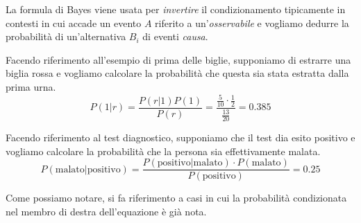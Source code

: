 La formula di Bayes viene usata per \emph{invertire} il condizionamento tipicamente in contesti
in cui accade un evento $A$ riferito a un'\emph{osservabile} e vogliamo dedurre la probabilità di
un'alternativa $B_i$ di eventi \emph{causa}.

\begin{example}
	Facendo riferimento all'esempio di prima delle biglie, supponiamo di estrarre una biglia
	rossa e vogliamo calcolare la probabilità che questa sia stata estratta dalla prima urna.
	\[
		P(1 | r) = \frac{P(r | 1) P(1)}{P(r)} =
		\frac{\frac{5}{10} \cdot \frac{1}{2}}{\frac{13}{20}} = 0.385
	\]
\end{example}

\begin{example}
	Facendo riferimento al test diagnostico, supponiamo che il test dia esito positivo e vogliamo
	calcolare la probabilità che la persona sia effettivamente malata.
	\[
		P(\text{malato} | \text{positivo}) =
		\frac{P(\text{positivo} | \text{malato}) \cdot
			P(\text{malato})}{P(\text{positivo})} = 0.25
	\]
\end{example}

Come possiamo notare, si fa riferimento a casi in cui la probabilità condizionata nel membro di
destra dell'equazione è già nota.